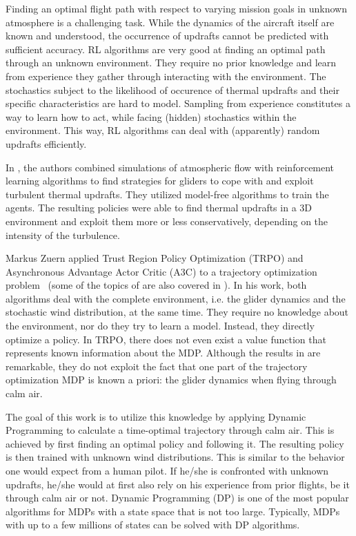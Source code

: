 Finding an optimal flight path with respect to varying mission goals in unknown atmosphere is a challenging task. While the dynamics of the aircraft itself are known and understood, the occurrence of updrafts cannot be predicted with sufficient accuracy. RL algorithms are very good at finding an optimal path through an unknown environment. They require no prior knowledge and learn from experience they gather through interacting with the environment. The stochastics subject to the likelihood of occurence of thermal updrafts and their specific characteristics are hard to model. Sampling from experience constitutes a way to learn how to act, while facing (hidden) stochastics within the environment. This way, RL algorithms can deal with (apparently) random updrafts efficiently.

In \cite{ReddyE4877}, the authors combined simulations of atmospheric flow with reinforcement learning algorithms to find strategies for gliders to cope with and exploit turbulent thermal updrafts. They utilized model-free algorithms to train the agents. The resulting policies were able to find thermal updrafts in a 3D environment and exploit them more or less conservatively, depending on the intensity of the turbulence.

Markus Zuern applied Trust Region Policy Optimization (TRPO) and Asynchronous Advantage Actor Critic (A3C) to a trajectory optimization problem~\cite{Zuern2017} (some of the topics of \cite{Zuern2017} are also covered in \cite{Notter2018}). In his work, both algorithms deal with the complete environment, i.e. the glider dynamics and the stochastic wind distribution, at the same time. They require no knowledge about the environment, nor do they try to learn a model. Instead, they directly optimize a policy. In TRPO, there does not even exist a value function that represents known information about the MDP. Although the results in \cite{Zuern2017} are remarkable, they do not exploit the fact that one part of the trajectory optimization MDP is known a priori: the glider dynamics when flying through calm air.

The goal of this work is to utilize this knowledge by applying Dynamic Programming to calculate a time-optimal trajectory through calm air. This is achieved by first finding an optimal policy and following it. The resulting policy is then trained with unknown wind distributions. This is similar to the behavior one would expect from a human pilot. If he/she is confronted with unknown updrafts, he/she would at first also rely on his experience from prior flights, be it through calm air or not. Dynamic Programming (DP) is one of the most popular algorithms for MDPs with a state space that is not too large. Typically, MDPs with up to a few millions of states can be solved with DP algorithms.


